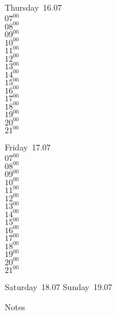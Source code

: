\documentclass[11pt,a4paper]{book}\usepackage[]{graphicx}\usepackage[]{color}
\begin{document}
\clearpage
\begin{headerbox}
\end{headerbox}
\begin{weekdaybox}
  Thursday~16.07\\
  { 
  \vfill
  $07^{00}$\\
$08^{00}$\\
$09^{00}$\\
$10^{00}$\\
$11^{00}$\\
$12^{00}$\\
$13^{00}$\\
$14^{00}$\\
$15^{00}$\\
$16^{00}$\\
$17^{00}$\\
$18^{00}$\\
$19^{00}$\\
$20^{00}$\\
$21^{00}$\\
  }
\end{weekdaybox} 
\begin{weekdaybox}
  Friday~17.07\\
  { 
  \vfill
  $07^{00}$\\
$08^{00}$\\
$09^{00}$\\
$10^{00}$\\
$11^{00}$\\
$12^{00}$\\
$13^{00}$\\
$14^{00}$\\
$15^{00}$\\
$16^{00}$\\
$17^{00}$\\
$18^{00}$\\
$19^{00}$\\
$20^{00}$\\
$21^{00}$\\
  }
\end{weekdaybox}
\begin{weekendbox}
  Saturday~18.07
  \tcblower
  Sunday~19.07
\end{weekendbox} %
\begin{notebox}
  Notes
\end{notebox}
\clearpage
\end{document}
